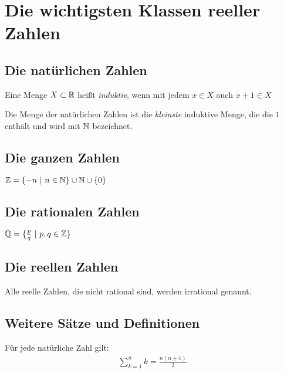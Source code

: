 \section{Die wichtigsten Klassen reeller Zahlen}
\subsection{Die natürlichen Zahlen}
\vspace{5pt}
\begin{frameddefn}
	Eine Menge $X \subset \mathbb{R}$ heißt \textit{induktiv}, wenn mit jedem $x \in X$ auch $x+1 \in X$
\end{frameddefn}

\begin{frameddefn}
	Die Menge der natürlichen Zahlen ist die \textit{kleinste} induktive Menge, die die $1$ enthält und wird mit $\mathbb{N}$ bezeichnet.
\end{frameddefn}

\subsection{Die ganzen Zahlen}

\begin{frameddefn}
	$\mathbb{Z} = \{-n \ |\  n \in \mathbb{N}\} \cup \mathbb{N} \cup \{0\}$
\end{frameddefn}

\subsection{Die rationalen Zahlen}
\vspace{5pt}
\begin{frameddefn}
	$\mathbb{Q} = \{ \frac{p}{q} \ |\  p,q \in \mathbb{Z}\}$
\end{frameddefn}

\subsection{Die reellen Zahlen}
Alle reelle Zahlen, die nicht rational sind, werden irrational genannt.

\subsection{Weitere Sätze und Definitionen}
\vspace{5pt}
\begin{framedthm}
	Für jede natürliche Zahl gilt:
	\begin{align*}
		\sum_{k=1}^{n} k = \frac{n(n+1)}{2}
	\end{align*}
\end{framedthm}

